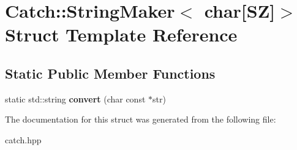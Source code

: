 \hypertarget{struct_catch_1_1_string_maker_3_01char[_s_z]_4}{}\section{Catch\+:\+:String\+Maker$<$ char\mbox{[}SZ\mbox{]}$>$ Struct Template Reference}
\label{struct_catch_1_1_string_maker_3_01char[_s_z]_4}
\subsection*{Static Public Member Functions}
\begin{DoxyCompactItemize}
\item 
\mbox{\label{struct_catch_1_1_string_maker_3_01char[_s_z]_4_a095e415534f9145300271befe9853357}} 
static std\+::string {\bfseries convert} (char const $\ast$str)
\end{DoxyCompactItemize}


The documentation for this struct was generated from the following file\+:\begin{DoxyCompactItemize}
\item 
catch.\+hpp\end{DoxyCompactItemize}
